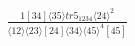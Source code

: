 \documentclass[varwidth, border=5pt]{standalone}
\begin{document}
\begin{my}
$\begin{gathered}
\scriptscriptstyle\frac{1[34]⟨35⟩tr5_{1234}⟨24⟩^2}{⟨12⟩⟨23⟩[24]⟨34⟩⟨45⟩^4[45]}
\end{gathered}$
\end{my}
\end{document}
